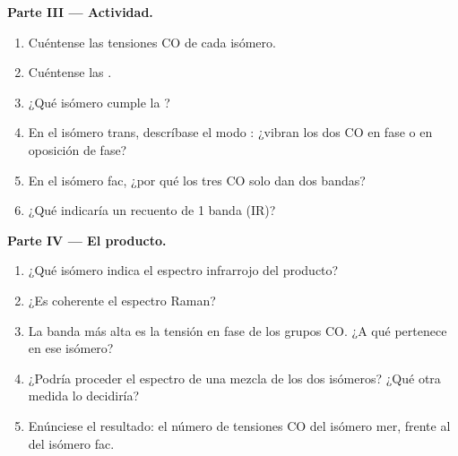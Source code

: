 \begin{problem}
\medskip\noindent\textbf{Parte III --- Actividad.}
\begin{enumerate}[resume]
  \item Cuéntense las tensiones CO  de cada isómero.
  \item Cuéntense las .
  \item ¿Qué isómero cumple la ?
  \item En el isómero trans, descríbase el modo : ¿vibran los dos CO
        en fase o en oposición de fase?
  \item En el isómero fac, ¿por qué los tres CO solo dan dos bandas?
  \item ¿Qué indicaría un recuento de 1 banda (IR)?
\end{enumerate}

\medskip\noindent\textbf{Parte IV --- El producto.}
\begin{enumerate}[resume]
  \item ¿Qué isómero indica el espectro infrarrojo del producto?
  \item ¿Es coherente el espectro Raman?
  \item La banda más alta es la tensión en fase de los grupos CO. ¿A qué
         pertenece en ese isómero?
  \item ¿Podría proceder el espectro de una mezcla de los dos isómeros? ¿Qué
        otra medida lo decidiría?
  \item Enúnciese el resultado: el número de tensiones CO  del isómero
        mer, frente al del isómero fac.
\end{enumerate}
\end{problem}
